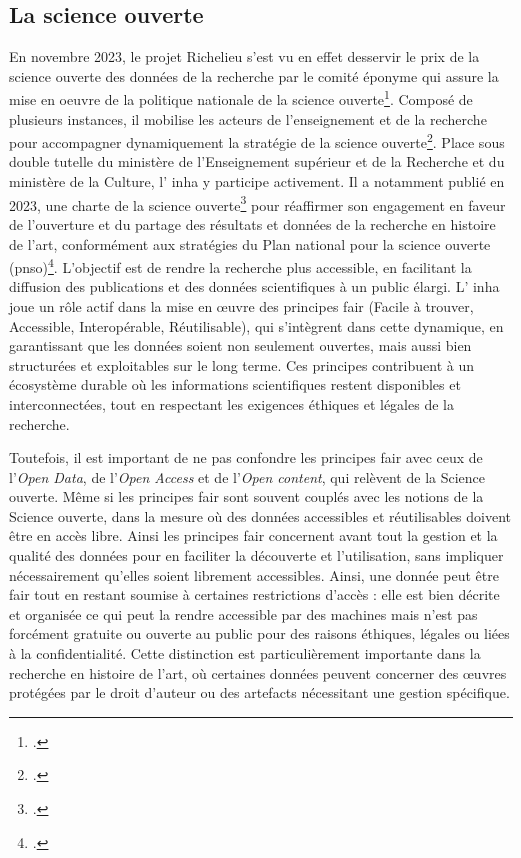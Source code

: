 \subsection{La science ouverte}
En novembre 2023, le projet Richelieu s'est vu en effet desservir le prix de la science ouverte des données de la recherche par le comité éponyme qui assure la mise en oeuvre de la politique nationale de la science ouverte\footcite{KERVEGANPrix2023, GTSODONNEESDECOUPERINReutiliser2024}. Composé de plusieurs instances, il mobilise les acteurs de l'enseignement et de la recherche pour accompagner dynamiquement la stratégie de la science ouverte\footcite{Presentation2024}. Place sous double tutelle du ministère de l'Enseignement supérieur et de la Recherche et du ministère de la Culture, l' \acrshort{inha} y participe activement. Il a notamment publié en 2023, une charte de la science ouverte\footcite{INHACharte2024} pour réaffirmer son engagement en faveur de l'ouverture et du partage des résultats et données de la recherche en histoire de l'art, conformément aux stratégies du Plan national pour la science ouverte (\acrshort{pnso})\footcite{INHAVers2023}. L'objectif est de rendre la recherche plus accessible, en facilitant la diffusion des publications et des données scientifiques à un public élargi. L' \acrshort{inha} joue un rôle actif dans la mise en œuvre des principes  \acrshort{fair} (Facile à trouver, Accessible, Interopérable, Réutilisable), qui s'intègrent dans cette dynamique, en garantissant que les données soient non seulement ouvertes, mais aussi bien structurées et exploitables sur le long terme. Ces principes contribuent à un écosystème durable où les informations scientifiques restent disponibles et interconnectées, tout en respectant les exigences éthiques et légales de la recherche.

Toutefois, il est important de ne pas confondre les principes  \acrshort{fair} avec ceux de l'\textit{Open Data}, de l'\textit{Open Access} et de l'\textit{Open content}, qui relèvent de la Science ouverte. Même si les principes \acrshort{fair} sont souvent couplés avec les notions de la Science ouverte, dans la mesure où des données accessibles et réutilisables doivent être en accès libre. Ainsi les principes \acrshort{fair} concernent avant tout la gestion et la qualité des données pour en faciliter la découverte et l'utilisation, sans impliquer nécessairement qu'elles soient librement accessibles. Ainsi, une donnée peut être  \acrshort{fair} tout en restant soumise à certaines restrictions d'accès : elle est bien décrite et organisée ce qui peut la rendre accessible par des machines mais n'est pas forcément gratuite ou ouverte au public pour des raisons éthiques, légales ou liées à la confidentialité. Cette distinction est particulièrement importante dans la recherche en histoire de l'art, où certaines données peuvent concerner des œuvres protégées par le droit d'auteur ou des artefacts nécessitant une gestion spécifique.

